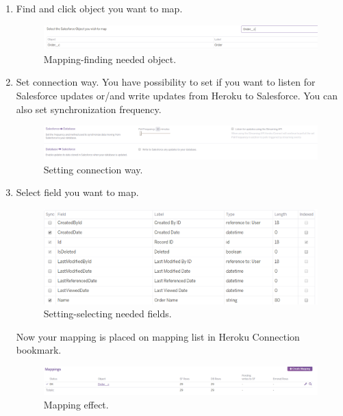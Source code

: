 \documentclass[12pt,a4paper]{article}
\begin{document}
\begin{enumerate}
\item Find and click object you want to map.
\begin{figure}[H]
	\centering
	\includegraphics[width=1\textwidth]{images/connect7.PNG}
	\caption{Mapping-finding needed object.}
	\label{fig:cong}
\end{figure}

\item Set connection way. You have possibility to set if you want to listen for Salesforce updates or/and write updates from Heroku to Salesforce. You can also set synchronization frequency. 
\begin{figure}[H]
	\centering
	\includegraphics[width=1\textwidth]{images/connect8.PNG}
	\caption{Setting connection way.}
	\label{fig:conh}
\end{figure}

\item Select field you want to map. 

\begin{figure}[H]
	\centering
	\includegraphics[width=1\textwidth]{images/connect9.PNG}
	\caption{Setting-selecting needed fields.}
	\label{fig:coni}
\end{figure}

Now your mapping is placed on mapping list in Heroku Connection bookmark. 

\begin{figure}[H]
	\centering
	\includegraphics[width=1\textwidth]{images/connect10.PNG}
	\caption{Mapping effect.}
	\label{fig:conj}
\end{figure}

\end{enumerate} 
\end{document}
